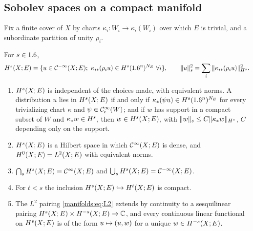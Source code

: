 \subsection{Sobolev spaces on a compact manifold}
Fix a finite cover of $X$ by charts $\kappa_i:W_i\to\kappa_i(W_i)$ over which $E$ is
trivial, and a subordinate partition of unity $\rho_i$.

\begin{definition}\label{manifolds:def:sobolev}
For $s\in1.6$,
\begin{equation*}
\Hs s(X;E)=\{u\in\CmI(X;E);\ \kappa_{i*}(\rho_iu)\in\Hs s(\R^n)^{N_E}\ \forall i\},
\qquad\|u\|_s^2=\sum_i\|\kappa_{i*}(\rho_iu)\|_{\Hs s}^2 .
\end{equation*}
\end{definition}

\begin{proposition}\label{manifolds:prop:sobolev}
\begin{enumerate}[label=\textup{(\alph*)}]
\item $H^{s}(X;E)$ is independent of the choices made, with equivalent norms. A
distribution $u$ lies in $H^{s}(X;E)$ if and only if $\kappa_*(\psi u)\in H^{s}(1.6^n)^{N_E}$
for every trivializing chart $\kappa$ and $\psi\in\mathcal{C}^\infty_{\mathrm{c}}(W)$; and if $w$ has support in a
compact subset of $W$ and $\kappa_*w\in H^{s}$, then $w\in H^{s}(X;E)$, with
$\|w\|_s\le C\|\kappa_*w\|_{H^{s}}$, $C$ depending only on the support.
\item $H^{s}(X;E)$ is a Hilbert space in which $\mathcal{C}^\infty(X;E)$ is dense, and
$H^{0}(X;E)=L^2(X;E)$ with equivalent norms.
\item $\bigcap_sH^{s}(X;E)=\mathcal{C}^\infty(X;E)$ and $\bigcup_sH^{s}(X;E)=\mathcal{C}^{-\infty}(X;E)$.
\item For $t<s$ the inclusion $H^{s}(X;E)\hookrightarrow H^{t}(X;E)$ is compact.
\item The $L^2$ pairing \eqref{manifolds:eq:L2} extends by continuity to a
sesquilinear pairing $H^{s}(X;E)\times H^{-s}(X;E)\to\mathbb{C}$, and every continuous linear
functional on $H^{s}(X;E)$ is of the form $u\mapsto( u, w)$ for a unique
$w\in H^{-s}(X;E)$.
\end{enumerate}
\end{proposition}
